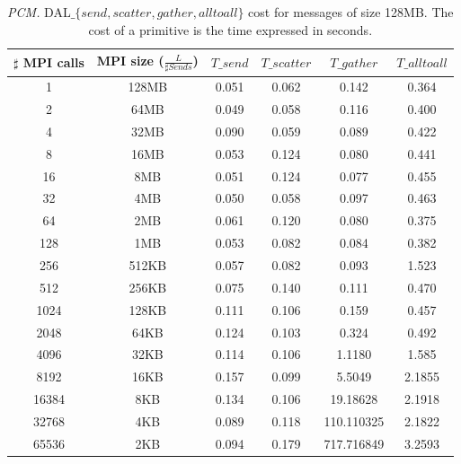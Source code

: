 \begin{table}[h]
\begin{center}
\begin{tabular}{|c|c|c|c|c|c|}\hline
\hline
$\sharp$ MPI calls & MPI size ($\frac{L}{\sharp Sends}$)  & $T\_send$   & $T\_scatter$  & $T\_gather$ & $T\_alltoall$      \\\hline\hline
1 & 128MB & 0.051 & 0.062 & 0.142 & 0.364 \\\hline
2 & 64MB & 0.049 & 0.058 & 0.116 & 0.400 \\\hline
4 & 32MB & 0.090 & 0.059 & 0.089 & 0.422 \\\hline
8 & 16MB & 0.053 & 0.124 & 0.080 & 0.441 \\\hline
16 & 8MB & 0.051 & 0.124 & 0.077 & 0.455 \\\hline
32 & 4MB & 0.050 & 0.058 & 0.097 & 0.463 \\\hline
64 & 2MB & 0.061 & 0.120 & 0.080 & 0.375 \\\hline
128 & 1MB & 0.053 & 0.082 & 0.084 & 0.382 \\\hline
256 & 512KB & 0.057 & 0.082 & 0.093 & 1.523 \\\hline
512 & 256KB & 0.075 & 0.140 & 0.111 & 0.470 \\\hline
1024 & 128KB & 0.111 & 0.106 & 0.159 & 0.457 \\\hline
2048 & 64KB & 0.124 & 0.103 & 0.324 & 0.492 \\\hline
4096 & 32KB & 0.114 & 0.106 & 1.1180 & 1.585 \\\hline
8192 & 16KB & 0.157 & 0.099 & 5.5049 & 2.1855 \\\hline
16384 & 8KB & 0.134 & 0.106 & 19.18628 & 2.1918 \\\hline
32768 & 4KB & 0.089 & 0.118 & 110.110325 & 2.1822 \\\hline
65536 & 2KB & 0.094 & 0.179 & 717.716849 & 3.2593 \\\hline
\end{tabular}
\caption{\textit{PCM.} DAL$\_\lbrace send, scatter, gather, alltoall \rbrace$ cost for messages of size 128MB. The cost of a primitive is the time expressed in seconds.}
\label{tsetup-pcm-n64-M128}
\end{center}
\end{table}

